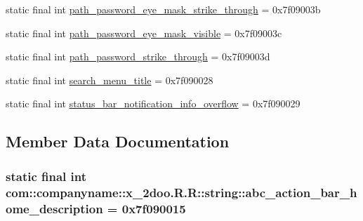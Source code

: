 \begin{CompactItemize}
\item 
static final int \hyperlink{classcom_1_1companyname_1_1x__2doo_1_1_r_1_1string_b02b64645092b788a3a511e68f2835a2}{path\_\-password\_\-eye\_\-mask\_\-strike\_\-through} = 0x7f09003b
\item 
static final int \hyperlink{classcom_1_1companyname_1_1x__2doo_1_1_r_1_1string_a8e589b501297ff54bd1b33449c33a0a}{path\_\-password\_\-eye\_\-mask\_\-visible} = 0x7f09003c
\item 
static final int \hyperlink{classcom_1_1companyname_1_1x__2doo_1_1_r_1_1string_e531555185955e4b2bf5c38a81406898}{path\_\-password\_\-strike\_\-through} = 0x7f09003d
\item 
static final int \hyperlink{classcom_1_1companyname_1_1x__2doo_1_1_r_1_1string_8f1d7166799e7614a8024b62b328c6d1}{search\_\-menu\_\-title} = 0x7f090028
\item 
static final int \hyperlink{classcom_1_1companyname_1_1x__2doo_1_1_r_1_1string_f94f345714975e4e890c38c92543597d}{status\_\-bar\_\-notification\_\-info\_\-overflow} = 0x7f090029
\end{CompactItemize}


\subsection{Member Data Documentation}
\hypertarget{classcom_1_1companyname_1_1x__2doo_1_1_r_1_1string_7dba15f47cc9ce3a23b5b920370ca7ac}{
\subsubsection[{abc\_\-action\_\-bar\_\-home\_\-description}]{\setlength{\rightskip}{0pt plus 5cm}static final int com::companyname::x\_\-2doo.R.R::string::abc\_\-action\_\-bar\_\-home\_\-description = 0x7f090015}}
\label{classcom_1_1companyname_1_1x__2doo_1_1_r_1_1string_7dba15f47cc9ce3a23b5b920370ca7ac}


